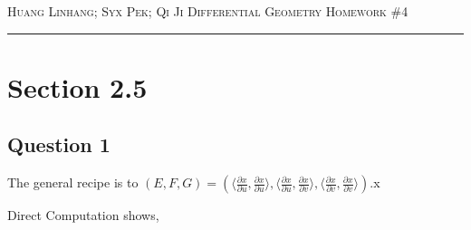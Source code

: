 \documentclass[12pt]{article}
\begin{document}
\thispagestyle{empty}

{\scshape Huang Linhang; Syx Pek; Qi Ji} \hfill {\scshape \large Differential Geometry} \hfill {\scshape Homework \#4}
 
\smallskip
\hrule
\bigskip
\section{Section 2.5}
\subsection*{Question 1}
The general recipe is to $(E, F, G) = (\langle \frac{ \partial x}{\partial u},\frac{ \partial x}{\partial u}\rangle, \langle\frac{ \partial x}{\partial u},\frac{ \partial x}{\partial v}\rangle,\langle\frac{ \partial x}{\partial v},\frac{ \partial x}{\partial v}\rangle)$.x

Direct Computation shows,
\end{document}
